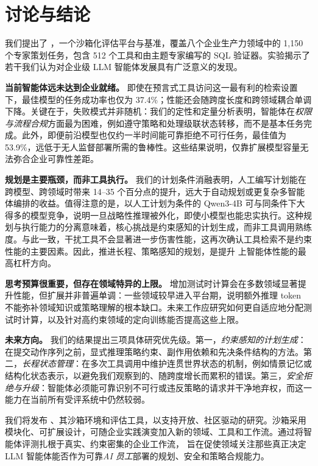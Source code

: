 \section{讨论与结论}

我们提出了 \ours{}，一个沙箱化评估平台与基准，覆盖八个企业生产力领域中的 1,150 个专家策划任务，包含 512 个工具和由主题专家编写的 SQL 验证器。实验揭示了若干我们认为对企业级 LLM 智能体发展具有广泛意义的发现。

\textbf{当前智能体远未达到企业就绪。}
即使在预言式工具访问这一最有利的检索设置下，最佳模型的任务成功率也仅为 37.4\%；性能还会随跨度长度和跨领域耦合单调下降。关键在于，失败模式并非随机：我们的定性和定量分析表明，智能体在\textit{权限与流程合规}方面最为困难，例如遵守策略和处理级联状态转移，而不是基本任务完成。此外，即便前沿模型也仅约一半时间能可靠拒绝不可行任务，最佳值为 53.9\%，远低于无人监督部署所需的鲁棒性。这些结果说明，仅靠扩展模型容量无法弥合企业可靠性差距。

\textbf{规划是主要瓶颈，而非工具执行。}
我们的计划条件消融表明，人工编写计划能在跨模型、跨领域时带来 14--35 个百分点的提升，远大于自动规划或更复杂多智能体编排的收益。值得注意的是，以人工计划为条件的 Qwen3-4B 可与同条件下大得多的模型竞争，说明一旦战略性推理被外化，即使小模型也能忠实执行。这种规划与执行能力的分离意味着，核心挑战是约束感知的计划生成，而非工具调用熟练度。与此一致，干扰工具不会显著进一步伤害性能，这再次确认工具检索不是约束性能的主要因素。因此，推进长程、策略感知的规划，是提升 \ours{} 上智能体性能的最高杠杆方向。

\textbf{思考预算很重要，但存在领域特异的上限。}
增加测试时计算会在多数领域显著提升性能，但扩展并非普遍单调：一些领域较早进入平台期，说明额外推理 token 不能弥补领域知识或策略理解的根本缺口。未来工作应研究如何更自适应地分配测试时计算，以及针对高约束领域的定向训练能否提高这些上限。

\textbf{未来方向。}
我们的结果提出三项具体研究优先级。第一，\textit{约束感知的计划生成}：在提交动作序列之前，显式推理策略约束、副作用依赖和先决条件结构的方法。第二，\textit{长程状态管理}：在多次工具调用中维护连贯世界状态的机制，例如情景记忆或结构化状态表示，以避免我们观察到的、随跨度增长而累积的错误。第三，\textit{安全拒绝与升级}：智能体必须能可靠识别不可行或违反策略的请求并干净地弃权，而这一能力在当前所有受评系统中仍然较弱。

我们将发布 \ours{}、其沙箱环境和评估工具，以支持开放、社区驱动的研究。沙箱采用模块化、可扩展设计，可随企业实践演变加入新的领域、工具和工作流。通过将智能体评测扎根于真实、约束密集的企业工作流，\ours{} 旨在促使领域关注那些真正决定 LLM 智能体能否作为可靠\textit{AI 员工}部署的规划、安全和策略合规能力。
